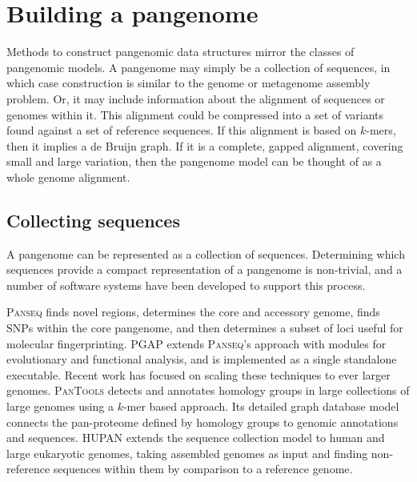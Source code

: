 


\section{Building a pangenome}
\label{sec:building}

Methods to construct pangenomic data structures mirror the classes of pangenomic models.
A pangenome may simply be a collection of sequences, in which case construction is similar to the genome or metagenome assembly problem.
Or, it may include information about the alignment of sequences or genomes within it.
This alignment could be compressed into a set of variants found against a set of reference sequences.
If this alignment is based on $k$-mers, then it implies a de Bruijn graph.
If it is a complete, gapped alignment, covering small and large variation, then the pangenome model can be thought of as a whole genome alignment.

\subsection{Collecting sequences}

A pangenome can be represented as a collection of sequences.
Determining which sequences provide a compact representation of a pangenome is non-trivial, and a number of software systems have been developed to support this process.

\textsc{Panseq} \cite{Laing_2010} finds novel regions, determines the core and accessory genome, finds SNPs within the core pangenome, and then determines a subset of loci useful for molecular fingerprinting.
\textsc{PGAP} \cite{Zhao_2011} extends \textsc{Panseq}'s approach with modules for evolutionary and functional analysis, and is implemented as a single standalone executable.
Recent work has focused on scaling these techniques to ever larger genomes.
\textsc{PanTools} \cite{Sheikhizadeh_Anari_2018} detects and annotates homology groups in large collections of large genomes using a $k$-mer based approach.
Its detailed graph database model connects the pan-proteome defined by homology groups to genomic annotations and sequences.
\textsc{HUPAN} \citep{Duan_2019} extends the sequence collection model to human and large eukaryotic genomes, taking assembled genomes as input and finding non-reference sequences within them by comparison to a reference genome.


